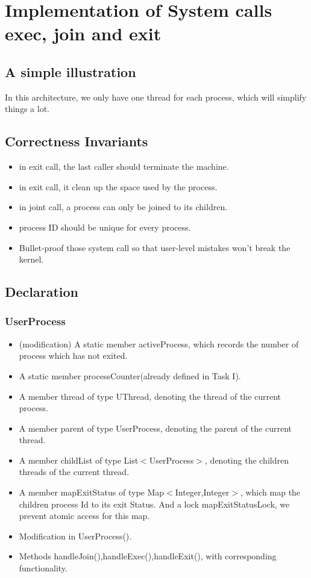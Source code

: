 \documentclass{article}
\begin{document}
	\section{Implementation of System calls exec, join and exit}
	\subsection{A simple illustration}
	In this architecture, we only have one thread for each process, which will simplify things a lot.
	\subsection{Correctness Invariants}
	\begin{itemize}
		\item in exit call, the last caller should terminate the machine.
		\item in exit call, it clean up the space used by the process.
		\item in joint call, a process can only be joined to its children.
		\item process ID should be unique for every process.
		\item Bullet-proof those system call so that user-level mistakes won't break the kernel.
	\end{itemize}
	\subsection{Declaration}
	\subsubsection*{UserProcess}
	\begin{itemize}
		\item (modification) A static member activeProcess, which records the number of process which has not exited.
		\item A static member processCounter(already defined in Task I).
		\item A member thread of type UThread, denoting the thread of the current process.
		\item A member parent of type UserProcess, denoting the parent of the current thread.
		\item A member childList of type List$<$UserProcess$>$, denoting the children threads of the current thread.
		\item A member mapExitStatus of type Map$<$Integer,Integer$>$, which map the children process Id to its exit Status. And a lock mapExitStatusLock, we prevent atomic access for this map.
		
		\item Modification in UserProcess().
		
		\item Methods handleJoin(),handleExec(),handleExit(), with corresponding functionality.
	\end{itemize}
	
\end{document}
